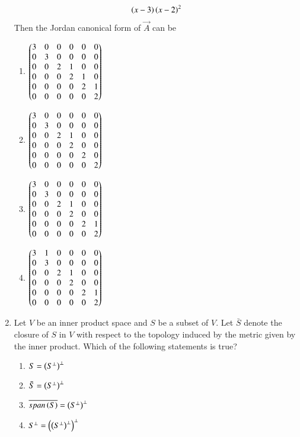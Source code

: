 \begin{enumerate}[label=\thesection.\arabic*.,ref=\thesection.\theenumi]
\begin{align}
\left(x-3\right)
\left(x-2\right)^2
\end{align}
%
Then the Jordan canonical form of $\vec{A}$ can be
\begin{enumerate}
\item  
$
\begin{pmatrix}
3 & 0 & 0 & 0 & 0 & 0 
\\
0 & 3 & 0 & 0 & 0 & 0 
\\
0 & 0 & 2 & 1 & 0 & 0 
\\
0 & 0 & 0 & 2 & 1 & 0 
\\
0 & 0 & 0 & 0 & 2 & 1 
\\
0 & 0 & 0 & 0 & 0 & 2
\end{pmatrix}
$ 
\item  
$
\begin{pmatrix}
3 & 0 & 0 & 0 & 0 & 0 
\\
0 & 3 & 0 & 0 & 0 & 0 
\\
0 & 0 & 2 & 1 & 0 & 0 
\\
0 & 0 & 0 & 2 & 0 & 0 
\\
0 & 0 & 0 & 0 & 2 & 0 
\\
0 & 0 & 0 & 0 & 0 & 2
\end{pmatrix}
$ 
\item  
$
\begin{pmatrix}
3 & 0 & 0 & 0 & 0 & 0 
\\
0 & 3 & 0 & 0 & 0 & 0 
\\
0 & 0 & 2 & 1 & 0 & 0 
\\
0 & 0 & 0 & 2 & 0 & 0 
\\
0 & 0 & 0 & 0 & 2 & 1 
\\
0 & 0 & 0 & 0 & 0 & 2
\end{pmatrix}
$ 
\item  
$
\begin{pmatrix}
3 & 1 & 0 & 0 & 0 & 0 
\\
0 & 3 & 0 & 0 & 0 & 0 
\\
0 & 0 & 2 & 1 & 0 & 0 
\\
0 & 0 & 0 & 2 & 0 & 0 
\\
0 & 0 & 0 & 0 & 2 & 1 
\\
0 & 0 & 0 & 0 & 0 & 2
\end{pmatrix}
$ 
\end{enumerate}
\solution

\item Let $V$ be an inner product space and $S$ be a
subset of $V$.  Let $\bar{S}$ denote the closure of $S$
in $V$ with respect to the topology induced by the metric
given by the inner product.  Which of the following statements is true?
\begin{enumerate}
\item $S = \left(S^{\perp}\right)^{\perp}$
\item $\bar{S} = \left(S^{\perp}\right)^{\perp}$
\item $\overline{span\left(S\right)} = \left(S^{\perp}\right)^{\perp}$
\item $S^{\perp} = \left(\left(S^{\perp}\right)^{\perp}\right)^{\perp}$

\end{enumerate}
\end{enumerate}
